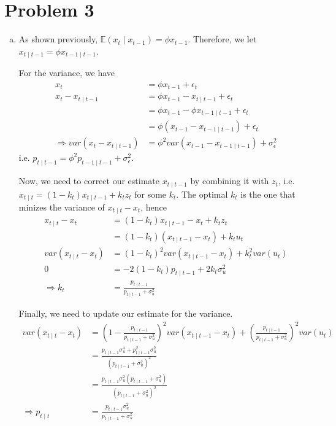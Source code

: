 \documentclass[12pt]{article}
\theoremstyle{definition}
\newcommand\E{\mathbb{E}}
\begin{document}
\section*{Problem 3}
\begin{enumerate}[(a)]
	\item
	
	As shown previously, $\E(x_t\mid x_{t-1}) = \phi x_{t-1}$. Therefore, we let $	x_{t\mid t-1} = \phi 	x_{t-1\mid t-1}$.
	
	For the variance, we have
	\begin{align*}
	x_t &= \phi x_{t-1}+\epsilon_t\\
	x_t-x_{t\mid t-1} &= \phi x_{t-1}- x_{t\mid t-1}+\epsilon_t\\
	&= \phi x_{t-1}- \phi 	x_{t-1\mid t-1}+\epsilon_t\\
	&= \phi (x_{t-1}- 	x_{t-1\mid t-1})+\epsilon_t\\
	\Rightarrow var(x_t-x_{t\mid t-1}) &= \phi^2 var(x_{t-1}- 	x_{t-1\mid t-1})+\sigma_\epsilon^2
	\end{align*}
	i.e. $p_{t\mid t-1} = \phi^2p_{t-1\mid t-1} +\sigma_\epsilon^2$.
	
	Now, we need to correct our estimate $x_{t\mid t-1}$ by combining it with $z_t$, i.e. $x_{t\mid t} = (1-k_t)x_{t\mid t-1}+k_t z_t$ for some $k_t$. The optimal $k_t$ is the one that minizes the variance of $x_{t\mid t}-x_t$, hence
	\begin{align*}
	x_{t\mid t}-x_t &= (1-k_t)x_{t\mid t-1}-x_t+k_t z_t \\
	&= (1-k_t)(x_{t\mid t-1}-x_t)+k_t u_t \\
	var(x_{t\mid t}-x_t) &= (1-k_t)^2var(x_{t\mid t-1}-x_t)+k_t^2 var(u_t) \\
	0 &= -2(1-k_t)p_{t\mid t-1}+2k_t \sigma_u^2 \\
	\Rightarrow k_t &= \frac{p_{t\mid t-1}}{p_{t\mid t-1}+\sigma_u^2}
	\end{align*}
	
	Finally, we need to update our estimate for the variance.
	\begin{align*}
	var(x_{t\mid t}-x_t) &= (1-\frac{p_{t\mid t-1}}{p_{t\mid t-1}+\sigma_u^2})^2var(x_{t\mid t-1}-x_t)+\left( \frac{p_{t\mid t-1}}{p_{t\mid t-1}+\sigma_u^2}\right) ^2 var(u_t) \\
	 &= \frac{p_{t\mid t-1}\sigma_u^4+p_{t\mid t-1}^2\sigma_u^2}{\left( p_{t\mid t-1}+\sigma_u^2\right) ^2}\\
	  &= \frac{p_{t\mid t-1}\sigma_u^2\left( p_{t\mid t-1}+\sigma_u^2\right)}{\left( p_{t\mid t-1}+\sigma_u^2\right) ^2}\\
	  \Rightarrow p_{t\mid t}  &= \frac{p_{t\mid t-1}\sigma_u^2}{ p_{t\mid t-1}+\sigma_u^2}
	\end{align*}
	

\end{enumerate}
\end{document}
